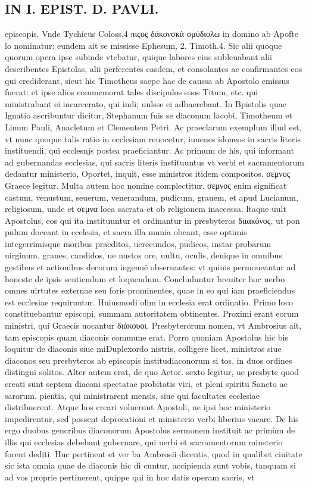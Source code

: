 \documentclass{article}
\begin{document}
\begin{pages}
\section*{IN I. EPIST. D. PAVLI. }
\marginpar{[ p.82 ]}\pstart episcopis. Vnde Tychicus Coloss.4 πιςος δάκονσκὰ σμύδιολω in domino ab Apofte lo nominatur: eundem ait se mississe Ephesum, 2. Timoth.4. Sic alii quoque quorum opera ipse subinde vtebatur, quique labores eius subleuabant alii describentes Epistolas, alii perferentes casdem, et consolantes ac confirmantes eos qui crediderant, sicut hic Timotheus saepe hac de caussa ab Apostolo emissus fuerat: et ipse alios commemorat tales discipulos suos Titum, etc. qui ministrabant ei incarcerato, qui indi; uulsse ei adhaerebant. In Bpistolis quae Ignatio ascribuntur dicitur, Stephanum fuis se diaconum lacobi, Timotheum et Linum Pauli, Anacletum et Clementem Petri. Ac praeclarum exemplum illud est, vt nunc quoque talis ratio in ecclesiam reuocetur, iuuenes idoneos in sacris literis instituendi, qui ecclesnjs postea praeficiantur. Ac primum de his, qui informant ad gubernandas ecclesias, qui sacris literis instituuntus vt verbi et sacramentorum dedantur ministerio, Oportet, inquit, esse ministros itidem compositos. σεμνος Graece legitur. Multa autem hoc nomine complectitur. σεμνος enim significat castum, venustum, seuerum, venerandum, pudicum, grauem, et apud Lucianum, religiosum, unde et σεμνα loca sacrata et ob religionem inaccessa. ltaque  uult Apostolus, eos qui ita instituuntur et ordinantur in presbyteros διιακόνος, ut pon pulum doceant in ecelesia, et sacra illa munia obeant, esse optimis integerrimisque moribus praeditos, uerecundos, pudicos, instar probarum uirginum, graues, candidos, ue nustos ore, uultu, oculis, denique in omnibus gestibus et actionibus decorum ingenuë obseruantes: vt quiuis permoueantur ad honeste de ipsis sentiendum et loquendum. Concluduntur breuiter hoc uerbo omnes uirtutes externae seu foris prominentes, quae in eo qui iam praeficiendus est ecclesiae requiruntur.  \pend\pstart Huiusmodi olim in ecclesia erat ordinatio. Primo loco constituebantur episcopi, summam autoritatem obtinentes. Proximi erant eorum ministri, qui Graecis uocantur διάκουοι. Presbyterorum nomen, vt Ambrosius ait, tam episcopis quam diaconis commune erat. Porro quoniam Apostolus hic bis loquitur de diaconis siue miDuplexordo nistris, colligere licet, ministros siue diaconos seu presbyteros ab episcopis institudiaconorum si tos, in duos ordines distingui solitos. Alter autem erat, de quo Actor. sexto legitur, ue presbyte quod creati sunt septem diaconi spectatae probitatis viri, et pleni spiritu Sancto ac sarorum. pientia, qui ministrarent mensis, siue qui facultates ecclesiae distribuerent. Atque hos creari voluerunt Apostoli, ne ipsi hoc ministerio impedirentur, sed possent deprecationi et ministerio verbi liberius vacare. De his ergo duobus gencribus diaconorum Apostolus sermonem instituit ac primùm de illis qui ecclesias debebant gubernare, qui uerbi et sacramentorum minsterio forent dediti. Huc pertinent et ver ba Ambrosii dicentis, quod in qualibet ciuitate sic ista omnia quae de diaconis hic di cuntur, accipienda sunt vobis, tanquam si ad vos proprie pertinerent, quippe qui in hoc datis operam sacris, vt 
\end{pages}
\end{document}
